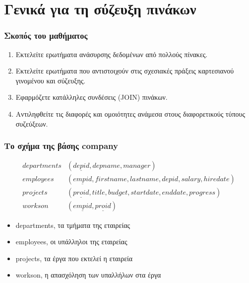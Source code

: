 \section[]{\textgreek{Γενικά για τη σύζευξη πινάκων}}


\begin{frame}
\frametitle{Σκοπός του μαθήματος}
\begin{minipage}{\wE}
\begin{enumerate} \itemsep 9pt %
  \item Εκτελείτε ερωτήματα ανάσυρσης δεδομένων από πολλούς πίνακες.
  \item Εκτελείτε ερωτήματα που αντιστοιχούν στις σχεσιακές πράξεις καρτεσιανού γινομένου
        και σύζευξης.
  \item Εφαρμόζετε κατάλληλες συνδέσεις ({\sq JOIN}) πινάκων.        
  \item Αντιληφθείτε τις διαφορές και ομοιότητες ανάμεσα στους διαφορετικούς τύπους
        συζεύξεων.
\end{enumerate}
\end{minipage}
\end{frame}


\begin{frame}
\frametitle{Το σχήμα της βάσης {\en company}}
\begin{align*}
  departments & (\underline{depid}, depname, manager) \\
  employees   & (\underline{empid}, firstname, lastname, depid, salary, hiredate) \\
  projects    & (\underline{proid}, title, budget, startdate, enddate, progress) \\
  workson     & (\underline{empid}, \underline{proid})
\end{align*}
\begin{itemize}
  \item {\ra departments}, τα τμήματα της εταιρείας
  \item {\ra employees}, οι υπάλληλοι της εταιρείας
  \item {\ra projects}, τα έργα που εκτελεί η εταιρεία
  \item {\ra workson}, η απασχόληση των υπαλλήλων στα έργα
\end{itemize}
\end{frame}




